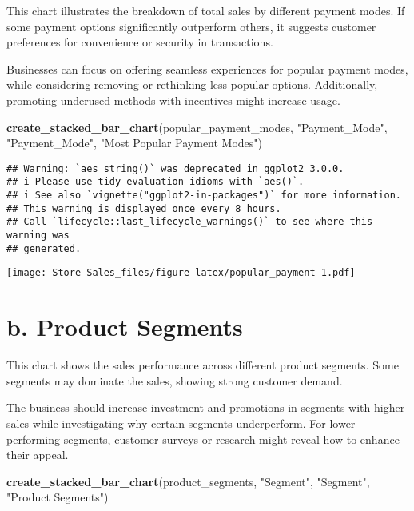 \documentclass[
]{article}
\newenvironment{Shaded}{\begin{snugshade}}{\end{snugshade}}
\newcommand{\FunctionTok}[1]{\textcolor[rgb]{0.13,0.29,0.53}{\textbf{#1}}}
\newcommand{\NormalTok}[1]{#1}
\newcommand{\StringTok}[1]{\textcolor[rgb]{0.31,0.60,0.02}{#1}}
\begin{document}
This chart illustrates the breakdown of total sales by different payment
modes. If some payment options significantly outperform others, it
suggests customer preferences for convenience or security in
transactions.

Businesses can focus on offering seamless experiences for popular
payment modes, while considering removing or rethinking less popular
options. Additionally, promoting underused methods with incentives might
increase usage.

\begin{Shaded}
\begin{Highlighting}[]
\FunctionTok{create\_stacked\_bar\_chart}\NormalTok{(popular\_payment\_modes, }\StringTok{"Payment\_Mode"}\NormalTok{, }\StringTok{"Payment\_Mode"}\NormalTok{, }\StringTok{"Most Popular Payment Modes"}\NormalTok{)}
\end{Highlighting}
\end{Shaded}

\begin{verbatim}
## Warning: `aes_string()` was deprecated in ggplot2 3.0.0.
## i Please use tidy evaluation idioms with `aes()`.
## i See also `vignette("ggplot2-in-packages")` for more information.
## This warning is displayed once every 8 hours.
## Call `lifecycle::last_lifecycle_warnings()` to see where this warning was
## generated.
\end{verbatim}

\texttt{[image: Store-Sales\_files/figure-latex/popular\_payment-1.pdf]}

\hypertarget{b.-product-segments}{%
\section{b. Product Segments}\label{b.-product-segments}}

This chart shows the sales performance across different product
segments. Some segments may dominate the sales, showing strong customer
demand.

The business should increase investment and promotions in segments with
higher sales while investigating why certain segments underperform. For
lower-performing segments, customer surveys or research might reveal how
to enhance their appeal.

\begin{Shaded}
\begin{Highlighting}[]
\FunctionTok{create\_stacked\_bar\_chart}\NormalTok{(product\_segments, }\StringTok{"Segment"}\NormalTok{, }\StringTok{"Segment"}\NormalTok{, }\StringTok{"Product Segments"}\NormalTok{)}
\end{Highlighting}
\end{Shaded}
\end{document}
